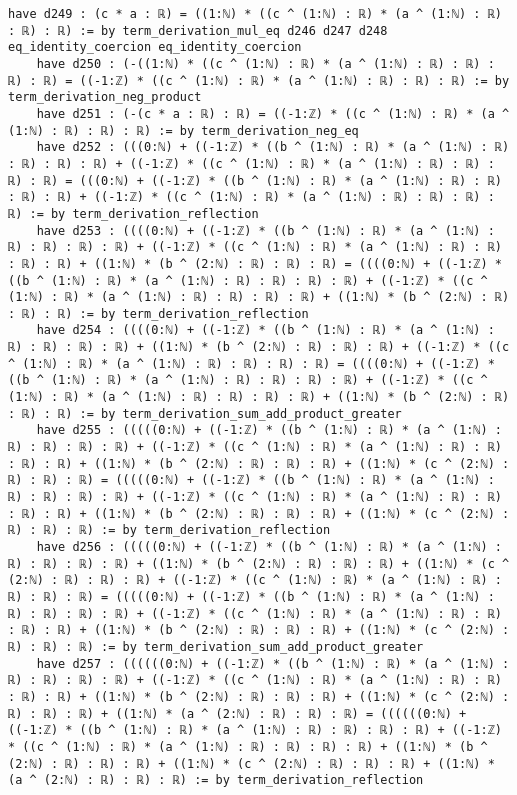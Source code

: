 \documentclass{article}
\begin{document}
\begin{tcolorbox}[colback=white!10, width=\linewidth]
\begin{lstlisting}[language=Lean4]
    have d249 : (c * a : ℝ) = ((1:ℕ) * ((c ^ (1:ℕ) : ℝ) * (a ^ (1:ℕ) : ℝ) : ℝ) : ℝ) := by term_derivation_mul_eq d246 d247 d248 eq_identity_coercion eq_identity_coercion
    have d250 : (-((1:ℕ) * ((c ^ (1:ℕ) : ℝ) * (a ^ (1:ℕ) : ℝ) : ℝ) : ℝ) : ℝ) = ((-1:ℤ) * ((c ^ (1:ℕ) : ℝ) * (a ^ (1:ℕ) : ℝ) : ℝ) : ℝ) := by term_derivation_neg_product
    have d251 : (-(c * a : ℝ) : ℝ) = ((-1:ℤ) * ((c ^ (1:ℕ) : ℝ) * (a ^ (1:ℕ) : ℝ) : ℝ) : ℝ) := by term_derivation_neg_eq
    have d252 : (((0:ℕ) + ((-1:ℤ) * ((b ^ (1:ℕ) : ℝ) * (a ^ (1:ℕ) : ℝ) : ℝ) : ℝ) : ℝ) + ((-1:ℤ) * ((c ^ (1:ℕ) : ℝ) * (a ^ (1:ℕ) : ℝ) : ℝ) : ℝ) : ℝ) = (((0:ℕ) + ((-1:ℤ) * ((b ^ (1:ℕ) : ℝ) * (a ^ (1:ℕ) : ℝ) : ℝ) : ℝ) : ℝ) + ((-1:ℤ) * ((c ^ (1:ℕ) : ℝ) * (a ^ (1:ℕ) : ℝ) : ℝ) : ℝ) : ℝ) := by term_derivation_reflection
    have d253 : ((((0:ℕ) + ((-1:ℤ) * ((b ^ (1:ℕ) : ℝ) * (a ^ (1:ℕ) : ℝ) : ℝ) : ℝ) : ℝ) + ((-1:ℤ) * ((c ^ (1:ℕ) : ℝ) * (a ^ (1:ℕ) : ℝ) : ℝ) : ℝ) : ℝ) + ((1:ℕ) * (b ^ (2:ℕ) : ℝ) : ℝ) : ℝ) = ((((0:ℕ) + ((-1:ℤ) * ((b ^ (1:ℕ) : ℝ) * (a ^ (1:ℕ) : ℝ) : ℝ) : ℝ) : ℝ) + ((-1:ℤ) * ((c ^ (1:ℕ) : ℝ) * (a ^ (1:ℕ) : ℝ) : ℝ) : ℝ) : ℝ) + ((1:ℕ) * (b ^ (2:ℕ) : ℝ) : ℝ) : ℝ) := by term_derivation_reflection
    have d254 : ((((0:ℕ) + ((-1:ℤ) * ((b ^ (1:ℕ) : ℝ) * (a ^ (1:ℕ) : ℝ) : ℝ) : ℝ) : ℝ) + ((1:ℕ) * (b ^ (2:ℕ) : ℝ) : ℝ) : ℝ) + ((-1:ℤ) * ((c ^ (1:ℕ) : ℝ) * (a ^ (1:ℕ) : ℝ) : ℝ) : ℝ) : ℝ) = ((((0:ℕ) + ((-1:ℤ) * ((b ^ (1:ℕ) : ℝ) * (a ^ (1:ℕ) : ℝ) : ℝ) : ℝ) : ℝ) + ((-1:ℤ) * ((c ^ (1:ℕ) : ℝ) * (a ^ (1:ℕ) : ℝ) : ℝ) : ℝ) : ℝ) + ((1:ℕ) * (b ^ (2:ℕ) : ℝ) : ℝ) : ℝ) := by term_derivation_sum_add_product_greater
    have d255 : (((((0:ℕ) + ((-1:ℤ) * ((b ^ (1:ℕ) : ℝ) * (a ^ (1:ℕ) : ℝ) : ℝ) : ℝ) : ℝ) + ((-1:ℤ) * ((c ^ (1:ℕ) : ℝ) * (a ^ (1:ℕ) : ℝ) : ℝ) : ℝ) : ℝ) + ((1:ℕ) * (b ^ (2:ℕ) : ℝ) : ℝ) : ℝ) + ((1:ℕ) * (c ^ (2:ℕ) : ℝ) : ℝ) : ℝ) = (((((0:ℕ) + ((-1:ℤ) * ((b ^ (1:ℕ) : ℝ) * (a ^ (1:ℕ) : ℝ) : ℝ) : ℝ) : ℝ) + ((-1:ℤ) * ((c ^ (1:ℕ) : ℝ) * (a ^ (1:ℕ) : ℝ) : ℝ) : ℝ) : ℝ) + ((1:ℕ) * (b ^ (2:ℕ) : ℝ) : ℝ) : ℝ) + ((1:ℕ) * (c ^ (2:ℕ) : ℝ) : ℝ) : ℝ) := by term_derivation_reflection
    have d256 : (((((0:ℕ) + ((-1:ℤ) * ((b ^ (1:ℕ) : ℝ) * (a ^ (1:ℕ) : ℝ) : ℝ) : ℝ) : ℝ) + ((1:ℕ) * (b ^ (2:ℕ) : ℝ) : ℝ) : ℝ) + ((1:ℕ) * (c ^ (2:ℕ) : ℝ) : ℝ) : ℝ) + ((-1:ℤ) * ((c ^ (1:ℕ) : ℝ) * (a ^ (1:ℕ) : ℝ) : ℝ) : ℝ) : ℝ) = (((((0:ℕ) + ((-1:ℤ) * ((b ^ (1:ℕ) : ℝ) * (a ^ (1:ℕ) : ℝ) : ℝ) : ℝ) : ℝ) + ((-1:ℤ) * ((c ^ (1:ℕ) : ℝ) * (a ^ (1:ℕ) : ℝ) : ℝ) : ℝ) : ℝ) + ((1:ℕ) * (b ^ (2:ℕ) : ℝ) : ℝ) : ℝ) + ((1:ℕ) * (c ^ (2:ℕ) : ℝ) : ℝ) : ℝ) := by term_derivation_sum_add_product_greater
    have d257 : ((((((0:ℕ) + ((-1:ℤ) * ((b ^ (1:ℕ) : ℝ) * (a ^ (1:ℕ) : ℝ) : ℝ) : ℝ) : ℝ) + ((-1:ℤ) * ((c ^ (1:ℕ) : ℝ) * (a ^ (1:ℕ) : ℝ) : ℝ) : ℝ) : ℝ) + ((1:ℕ) * (b ^ (2:ℕ) : ℝ) : ℝ) : ℝ) + ((1:ℕ) * (c ^ (2:ℕ) : ℝ) : ℝ) : ℝ) + ((1:ℕ) * (a ^ (2:ℕ) : ℝ) : ℝ) : ℝ) = ((((((0:ℕ) + ((-1:ℤ) * ((b ^ (1:ℕ) : ℝ) * (a ^ (1:ℕ) : ℝ) : ℝ) : ℝ) : ℝ) + ((-1:ℤ) * ((c ^ (1:ℕ) : ℝ) * (a ^ (1:ℕ) : ℝ) : ℝ) : ℝ) : ℝ) + ((1:ℕ) * (b ^ (2:ℕ) : ℝ) : ℝ) : ℝ) + ((1:ℕ) * (c ^ (2:ℕ) : ℝ) : ℝ) : ℝ) + ((1:ℕ) * (a ^ (2:ℕ) : ℝ) : ℝ) : ℝ) := by term_derivation_reflection

\end{lstlisting}
\end{tcolorbox}
\end{document}
